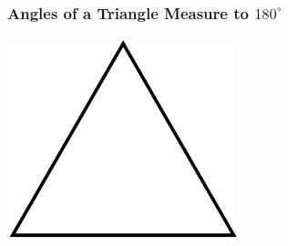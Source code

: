 \documentclass{beamer}
\begin{document}
\begin{frame}
    \frametitle{Angles of a Triangle Measure to $180^\circ$}
    \begin{center}
        \includegraphics[width=0.5\textwidth]{triangle.png} 
    \end{center}
\end{frame}
\end{document}
